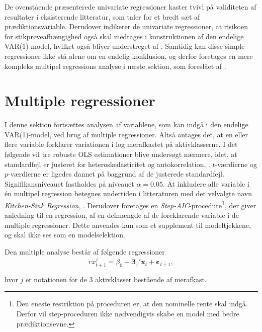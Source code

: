 \documentclass[
  a4paper,
  oneside]{memoir}
\begin{document}
\begin{table}[H]
\begin{threeparttable}
\begin{tablenotes}
\end{tablenotes}
\end{threeparttable}
\end{table}

De ovenstående præsenterede univariate regressioner kaster tvivl på validiteten af resultater i eksisterende litteratur, som taler for et bredt sæt af prædiktionsvariable. Derudover indikerer de univariate regressioner, at risikoen for stikprøveafhængighed også skal medtages i konstruktionen af den endelige VAR(1)-model, hvilket også bliver understreget af \citep{Goyal2007}. Samtidig kan disse simple regressioner ikke stå alene om en endelig konklusion, og derfor foretages en mere kompleks multipel regressions analyse i næste sektion, som foreslået af \citep{Goyal2007}.

\hypertarget{multreg}{%
\section{Multiple regressioner}\label{multreg}}

I denne sektion fortsættes analysen af variablene, som kan indgå i den endelige VAR(1)-model, ved brug af multiple regressioner. Altså antages det, at en eller flere variable forklarer variationen i log merafkastet på aktivklasserne. I det følgende vil tre robuste OLS estimationer blive undersøgt nærmere, idet, at standardfejl er justeret for heteroskedasticitet og autokorrelation, \citep{Newey1987}. \(t\)-værdierne og \(p\)-værdierne er ligedes dannet på baggrund af de justerede standardfejl. Signifikansniveauet fastholdes på niveauet \(\alpha=0.05\). At inkludere alle variable i én multipel regression betegnes undertiden i litteraturen med det velvalgte navn \emph{Kitchen-Sink Regression}, \citep{Goyal2007}. Derudover foretages en \emph{Step-AIC}-procedure\footnote{Den eneste restriktion på proceduren er, at den nominelle rente skal indgå. Derfor vil step-proceduren ikke nødvendigvis skabe en model med bedre prædiktionsevne.}, der giver anledning til en regression, af en delmængde af de foreklarende variable i de multiple regressioner. Dette anvendes kun som et supplement til modeltjekkene, og skal ikke ses som en modelselektion.

Den multiple analyse består af følgende regressioner
\[rx_{t+1}^j=\beta_{0}+\bm{\beta}_{1}'\bm{x}_{t}+\bm{\varepsilon}_{t+1},\]

hvor \(j\) er notationen for de \(3\) aktivklasser bestående af merafkast.
\end{document}
